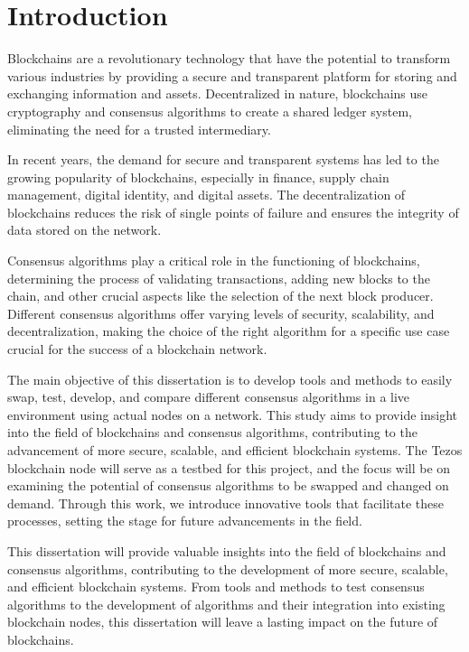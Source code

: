 \chapter{Introduction}
\label{chap:int}



Blockchains are a revolutionary technology that have the potential to transform various industries by providing a secure and transparent platform for storing and exchanging information and assets. Decentralized in nature, blockchains use cryptography and consensus algorithms to create a shared ledger system, eliminating the need for a trusted intermediary.

In recent years, the demand for secure and transparent systems has led to the growing popularity of blockchains, especially in finance, supply chain management, digital identity, and digital assets. The decentralization of blockchains reduces the risk of single points of failure and ensures the integrity of data stored on the network.

Consensus algorithms play a critical role in the functioning of blockchains, determining the process of validating transactions, adding new blocks to the chain, and other crucial aspects like the selection of the next block producer. Different consensus algorithms offer varying levels of security, scalability, and decentralization, making the choice of the right algorithm for a specific use case crucial for the success of a blockchain network.

The main objective of this dissertation is to develop tools and methods to easily swap, test, develop, and compare different consensus algorithms in a live environment using actual nodes on a network. This study aims to provide insight into the field of blockchains and consensus algorithms, contributing to the advancement of more secure, scalable, and efficient blockchain systems. The Tezos \cite{goodman2014tezos} blockchain node will serve as a testbed for this project, and the focus will be on examining the potential of consensus algorithms to be swapped and changed on demand. Through this work, we introduce innovative tools that facilitate these processes, setting the stage for future advancements in the field.

This dissertation will provide valuable insights into the field of blockchains and consensus algorithms, contributing to the development of more secure, scalable, and efficient blockchain systems. From tools and methods to test consensus algorithms to the development of algorithms and their integration into existing blockchain nodes, this dissertation will leave a lasting impact on the future of blockchains.


